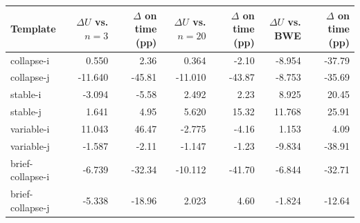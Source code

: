\begin{tabular}{lrrrrrr}
\toprule
Template & $\Delta U$ vs. $n=3$ & $\Delta$ on time (pp) & $\Delta U$ vs. $n=20$ & $\Delta$ on time (pp) & $\Delta U$ vs. BWE & $\Delta$ on time (pp)\\
\midrule
collapse-i & 0.550 & 2.36 & 0.364 & -2.10 & -8.954 & -37.79\\
collapse-j & -11.640 & -45.81 & -11.010 & -43.87 & -8.753 & -35.69\\
stable-i & -3.094 & -5.58 & 2.492 & 2.23 & 8.925 & 20.45\\
stable-j & 1.641 & 4.95 & 5.620 & 15.32 & 11.768 & 25.91\\
variable-i & 11.043 & 46.47 & -2.775 & -4.16 & 1.153 & 4.09\\
variable-j & -1.587 & -2.11 & -1.147 & -1.23 & -9.834 & -38.91\\
brief-collapse-i & -6.739 & -32.34 & -10.112 & -41.70 & -6.844 & -32.71\\
brief-collapse-j & -5.338 & -18.96 & 2.023 & 4.60 & -1.824 & -12.64\\
\bottomrule
\end{tabular}
